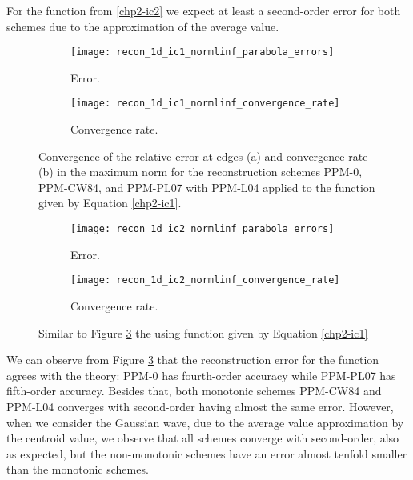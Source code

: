 For the function from \eqref{chp2-ic2} we expect at least a second-order error for both
 schemes due to the approximation of the average value. 
\begin{figure}[!ht]
	\centering
	\begin{subfigure}{0.48\textwidth}
		\centering
		\texttt{[image: recon\_1d\_ic1\_normlinf\_parabola\_errors]}
		\caption{Error.\label{chp2-sec-exp-rec1-error}}
	\end{subfigure}
	\begin{subfigure}{0.48\textwidth}
		\centering
		\texttt{[image: recon\_1d\_ic1\_normlinf\_convergence\_rate]}
		\caption{Convergence rate.\label{chp2-sec-exp-rec1-CR}}
	\end{subfigure}
	\caption{Convergence of the relative error at edges (a) and convergence rate (b) in
		 the maximum norm for the reconstruction
		 schemes PPM-0, PPM-CW84, and PPM-PL07 with PPM-L04 applied to the function
		 given by Equation \eqref{chp2-ic1}.\label{chp2-sec-exp-rec1}}
\end{figure}
\begin{figure}[!ht]
	\centering
	\begin{subfigure}{0.48\textwidth}
		\centering
		\texttt{[image: recon\_1d\_ic2\_normlinf\_parabola\_errors]}
		\caption{Error.\label{chp2-sec-exp-rec2-error}}
	\end{subfigure}
	\begin{subfigure}{0.48\textwidth}
		\centering
		\texttt{[image: recon\_1d\_ic2\_normlinf\_convergence\_rate]}
		\caption{Convergence rate.\label{chp2-sec-exp-rec2-CR}}
	\end{subfigure}
	\caption{Similar to Figure \ref{chp2-sec-exp-rec1} the using function
		    given by Equation \eqref{chp2-ic1}}
\end{figure}

We can observe from Figure \ref{chp2-sec-exp-rec1} that the reconstruction error
for the function agrees with the theory: PPM-0 has fourth-order accuracy
while PPM-PL07  has fifth-order accuracy. Besides that, both monotonic schemes PPM-CW84 and
PPM-L04 converges with second-order having almost the same error.
However, when we consider the Gaussian wave, due to the average value approximation
by the centroid value, we observe that all schemes converge with second-order,
also as expected, but the non-monotonic schemes have an error almost tenfold smaller
than the monotonic schemes. 
\newpage
